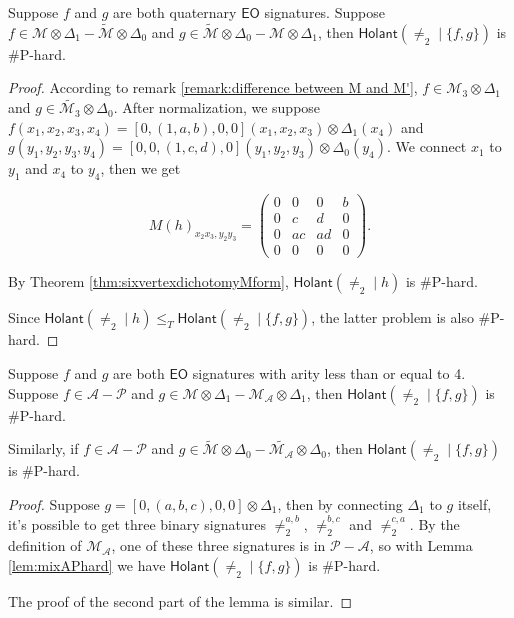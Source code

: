 \documentclass[a4paper,UKenglish,cleveref, autoref, thm-restate]{lipics-v2021}
\newcommand{\bi}[2]{\neq_2^{#1,#2}}
\newcommand{\hol}[0]{\textsf{Holant}}
\newcommand{\eo}[0]{\textsf{EO}}
\begin{document}
\begin{lemma}\label{lem:mixMM'hard}
Suppose $f$ and $g$ are both quaternary $\eo$ signatures. Suppose $f\in\mathscr{M}\otimes\Delta_1-\widetilde{\mathscr{M}}\otimes\Delta_0$ and $g\in\widetilde{\mathscr{M}}\otimes\Delta_0-\mathscr{M}\otimes\Delta_1$, then $\hol(\neq_2\mid\{f,g\})$ is \#P-hard.
\end{lemma}
\begin{proof}
According to remark \ref{remark:difference between M and M'}, $f\in\mathscr{M}_3\otimes\Delta_1$ and $g\in\widetilde{\mathscr{M}_3}\otimes\Delta_0$. After normalization, we suppose $f(x_1,x_2,x_3,x_4)=[0,(1,a,b),0,0](x_1,x_2,x_3)\otimes\Delta_1(x_4)$ and $g(y_1,y_2,y_3,y_4)=[0,0,(1,c,d),0](y_1,y_2,y_3)\otimes\Delta_0(y_4)$. We connect $x_1$ to $y_1$ and $x_4$ to $y_4$, then we get

$$M(h)_{x_2x_3,y_2y_3}=\left(\begin{array}{cccc}
0 & 0 & 0 & b\\
0 & c & d & 0\\
0 & ac & ad & 0\\
0 & 0 & 0 & 0
\end{array} 
\right).$$

By Theorem \ref{thm:sixvertexdichotomyMform}, $\hol(\neq_2\mid h)$ is \#P-hard.

Since $\hol(\neq_2\mid h)\leq_T\hol(\neq_2\mid\{f,g\})$, the latter problem is also \#P-hard.
\end{proof}


\begin{lemma}\label{lem:mixAP and Mtensorhard}
Suppose $f$ and $g$ are both $\eo$ signatures with arity less than or equal to 4. Suppose $f\in\mathscr{A}-\mathscr{P}$ and $g\in\mathscr{M}\otimes\Delta_1-\mathscr{M}_\mathscr{A}\otimes\Delta_1$, then $\hol(\neq_2\mid\{f,g\})$ is \#P-hard.

Similarly, if $f\in\mathscr{A}-\mathscr{P}$ and $g\in\widetilde{\mathscr{M}}\otimes\Delta_0-\widetilde{\mathscr{M}_\mathscr{A}}\otimes\Delta_0$, then $\hol(\neq_2\mid\{f,g\})$ is \#P-hard.
\end{lemma}
\begin{proof}


Suppose $g=[0,(a,b,c),0,0]\otimes\Delta_1$, then by connecting $\Delta_1$ to $g$ itself, it's possible to get three binary signatures $\bi{a}{b}$, $\bi{b}{c}$ and $\bi{c}{a}$. By the definition of $\mathscr{M}_\mathscr{A}$, one of these three signatures is in $\mathscr{P}-\mathscr{A}$, so with Lemma \ref{lem:mixAPhard} we have $\hol(\neq_2\mid\{f,g\})$ is \#P-hard.

The proof of the second part of the lemma is similar.
\end{proof}
\end{document}
